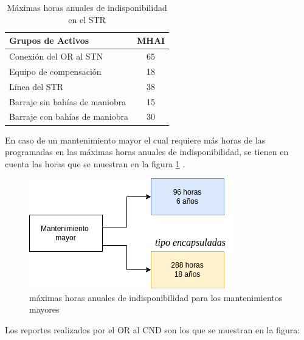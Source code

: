 \documentclass[a5paper]{book}%
\begin{document}
  \begin{table}[H]
    \centering
    \caption{Máximas horas anuales de  indisponibilidad  en el \ac{STR}}
  \begin{tabular}{|p{6cm}|c|}
    \hline
Grupos de Activos&
MHAI\\\hline
Conexión del OR al STN&
65\\\hline
Equipo de compensación&
18\\\hline
Línea del STR&
38\\\hline
Barraje sin bahías de maniobra&
15\\\hline
Barraje con bahías de maniobra&
30\\\hline

  \end{tabular}
\end{table}

En caso de un mantenimiento mayor el cual requiere más horas de las programadas en las máximas horas anuales de indisponibilidad, se tienen en cuenta las horas que se muestran en la figura \ref{fig:mayor} \cite{CREG0152018}.

    \begin{figure}[H]
      \centering
      \caption{máximas horas anuales de indisponibilidad para los mantenimientos mayores}
      \label{fig:mayor}
      \includegraphics[width=\linewidth]{mantenimoento_mayor}
    \end{figure}
  

  Los reportes realizados por el \ac{OR} al \ac{CND} son los que se muestran en la figura:
  
\end{document}
